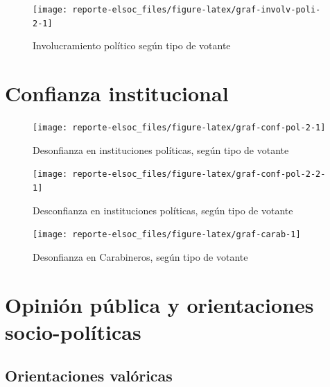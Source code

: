 \documentclass[
  12pt,
]{book}
\begin{document}
\begin{figure}

{\centering \texttt{[image: reporte-elsoc\_files/figure-latex/graf-involv-poli-2-1]} 

}

\caption{Involucramiento político según tipo de votante}\label{fig:graf-involv-poli-2}
\end{figure}

\hypertarget{confianza-institucional}{%
\section{Confianza institucional}\label{confianza-institucional}}

\begin{figure}

{\centering \texttt{[image: reporte-elsoc\_files/figure-latex/graf-conf-pol-2-1]} 

}

\caption{Desonfianza en instituciones políticas, según tipo de votante}\label{fig:graf-conf-pol-2}
\end{figure}

\begin{figure}

{\centering \texttt{[image: reporte-elsoc\_files/figure-latex/graf-conf-pol-2-2-1]} 

}

\caption{Desconfianza en instituciones políticas, según tipo de votante}\label{fig:graf-conf-pol-2-2}
\end{figure}

\begin{figure}

{\centering \texttt{[image: reporte-elsoc\_files/figure-latex/graf-carab-1]} 

}

\caption{Desonfianza en Carabineros, según tipo de votante}\label{fig:graf-carab}
\end{figure}

\hypertarget{opiniuxf3n-puxfablica-y-orientaciones-socio-poluxedticas}{%
\section{Opinión pública y orientaciones socio-políticas}\label{opiniuxf3n-puxfablica-y-orientaciones-socio-poluxedticas}}

\hypertarget{orientaciones-valuxf3ricas}{%
\subsection{Orientaciones valóricas}\label{orientaciones-valuxf3ricas}}
\end{document}
